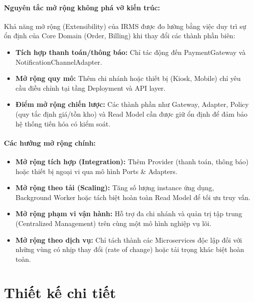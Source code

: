 \paragraph{Nguyên tắc mở rộng không phá vỡ kiến trúc:}
Khả năng mở rộng (Extensibility) của IRMS được đo lường bằng việc duy trì sự ổn định của Core Domain (Order, Billing) khi thay đổi các thành phần biên:
\begin{itemize}
    \item \textbf{Tích hợp thanh toán/thông báo:} Chỉ tác động đến \textsf{PaymentGateway} và \textsf{NotificationChannelAdapter}.
    \item \textbf{Mở rộng quy mô:} Thêm chi nhánh hoặc thiết bị (Kiosk, Mobile) chỉ yêu cầu điều chỉnh tại tầng Deployment và API layer.
    \item \textbf{Điểm mở rộng chiến lược:} Các thành phần như Gateway, Adapter, Policy (quy tắc định giá/tồn kho) và Read Model cần được giữ ổn định để đảm bảo hệ thống tiến hóa có kiểm soát.
\end{itemize}

\paragraph{Các hướng mở rộng chính:}
\begin{itemize}
    \item \textbf{Mở rộng tích hợp (Integration):} Thêm Provider (thanh toán, thông báo) hoặc thiết bị ngoại vi qua mô hình Ports \& Adapters.
    \item \textbf{Mở rộng theo tải (Scaling):} Tăng số lượng instance ứng dụng, Background Worker hoặc tách biệt hoàn toàn Read Model để tối ưu truy vấn.
    \item \textbf{Mở rộng phạm vi vận hành:} Hỗ trợ đa chi nhánh và quản trị tập trung (Centralized Management) trên cùng một mô hình nghiệp vụ lõi.
    \item \textbf{Mở rộng theo dịch vụ:} Chỉ tách thành các Microservices độc lập đối với những vùng có nhịp thay đổi (rate of change) hoặc tải trọng khác biệt hoàn toàn.
\end{itemize}
\pagebreak
\section{Thiết kế chi tiết}
